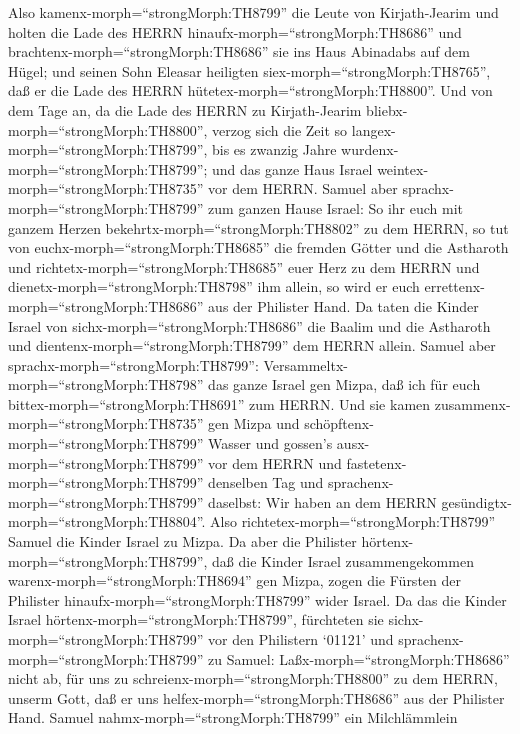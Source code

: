  Also kamenx-morph=``strongMorph:TH8799'' die Leute von
Kirjath-Jearim und holten die Lade des HERRN
hinaufx-morph=``strongMorph:TH8686'' und
brachtenx-morph=``strongMorph:TH8686'' sie ins Haus Abinadabs auf dem
Hügel; und seinen Sohn Eleasar heiligten
siex-morph=``strongMorph:TH8765'', daß er die Lade des HERRN
hütetex-morph=``strongMorph:TH8800''.  Und von dem Tage an,
da die Lade des HERRN zu Kirjath-Jearim
bliebx-morph=``strongMorph:TH8800'', verzog sich die Zeit so
langex-morph=``strongMorph:TH8799'', bis es zwanzig Jahre
wurdenx-morph=``strongMorph:TH8799''; und das ganze Haus Israel
weintex-morph=``strongMorph:TH8735'' vor dem HERRN.  Samuel
aber sprachx-morph=``strongMorph:TH8799'' zum ganzen Hause Israel: So
ihr euch mit ganzem Herzen bekehrtx-morph=``strongMorph:TH8802'' zu dem
HERRN, so tut von euchx-morph=``strongMorph:TH8685'' die fremden Götter
und die Astharoth und richtetx-morph=``strongMorph:TH8685'' euer Herz zu
dem HERRN und dienetx-morph=``strongMorph:TH8798'' ihm allein, so wird
er euch errettenx-morph=``strongMorph:TH8686'' aus der Philister Hand.
 Da taten die Kinder Israel von
sichx-morph=``strongMorph:TH8686'' die Baalim und die Astharoth und
dientenx-morph=``strongMorph:TH8799'' dem HERRN allein. 
Samuel aber sprachx-morph=``strongMorph:TH8799'':
Versammeltx-morph=``strongMorph:TH8798'' das ganze Israel gen Mizpa, daß
ich für euch bittex-morph=``strongMorph:TH8691'' zum HERRN. 
Und sie kamen zusammenx-morph=``strongMorph:TH8735'' gen Mizpa und
schöpftenx-morph=``strongMorph:TH8799'' Wasser und gossen's
ausx-morph=``strongMorph:TH8799'' vor dem HERRN und
fastetenx-morph=``strongMorph:TH8799'' denselben Tag und
sprachenx-morph=``strongMorph:TH8799'' daselbst: Wir haben an dem HERRN
gesündigtx-morph=``strongMorph:TH8804''. Also
richtetex-morph=``strongMorph:TH8799'' Samuel die Kinder Israel zu
Mizpa.  Da aber die Philister
hörtenx-morph=``strongMorph:TH8799'', daß die Kinder Israel
zusammengekommen warenx-morph=``strongMorph:TH8694'' gen Mizpa, zogen
die Fürsten der Philister hinaufx-morph=``strongMorph:TH8799'' wider
Israel. Da das die Kinder Israel hörtenx-morph=``strongMorph:TH8799'',
fürchteten sie sichx-morph=``strongMorph:TH8799'' vor den Philistern
 `01121' und sprachenx-morph=``strongMorph:TH8799'' zu
Samuel: Laßx-morph=``strongMorph:TH8686'' nicht ab, für uns zu
schreienx-morph=``strongMorph:TH8800'' zu dem HERRN, unserm Gott, daß er
uns helfex-morph=``strongMorph:TH8686'' aus der Philister Hand.
 Samuel nahmx-morph=``strongMorph:TH8799'' ein Milchlämmlein
